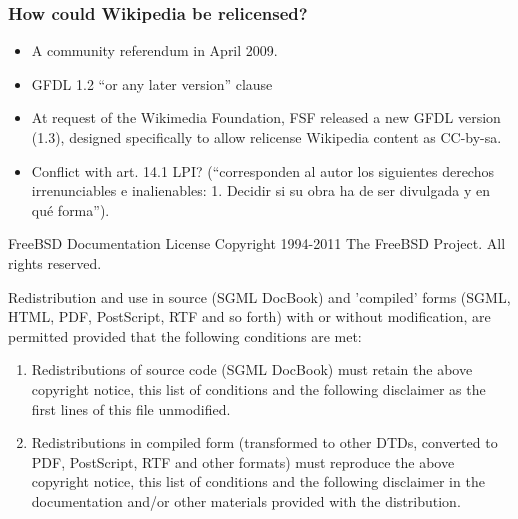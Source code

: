 
\begin{frame}
\frametitle {How could Wikipedia be relicensed?}

\pause

\begin{itemize}
\item A community referendum in April 2009.
\item GFDL 1.2 ``\alert{or} any later version'' clause
\item At request of the Wikimedia Foundation, FSF released a new GFDL version (1.3), designed
specifically to allow relicense Wikipedia content as CC-by-sa.
\item Conflict with art. 14.1 LPI? (``corresponden al autor los siguientes derechos irrenunciables e \alert{inalienables}: 1. Decidir si su obra ha de ser divulgada y en qué forma'').
\end{itemize}

\end{frame}



\begin{frame}

\begin{block}{FreeBSD Documentation License} 
Copyright 1994-2011 The FreeBSD Project. All rights reserved. \\

\smallskip

Redistribution and use in source (SGML DocBook) and 'compiled' forms (SGML, HTML, PDF, PostScript, RTF and so forth) with or without modification, are permitted provided that the following conditions are met:

\begin{enumerate}
\item Redistributions of source code (SGML DocBook) must retain the above copyright notice, this list of conditions and the following disclaimer as the first lines of this file unmodified.
\item Redistributions in compiled form (transformed to other DTDs, converted to PDF, PostScript, RTF and other formats) must reproduce the above copyright notice, this list of conditions and the following disclaimer in the documentation and/or other materials provided with the distribution.
\end{enumerate}
 
\end{block}

\end{frame}


